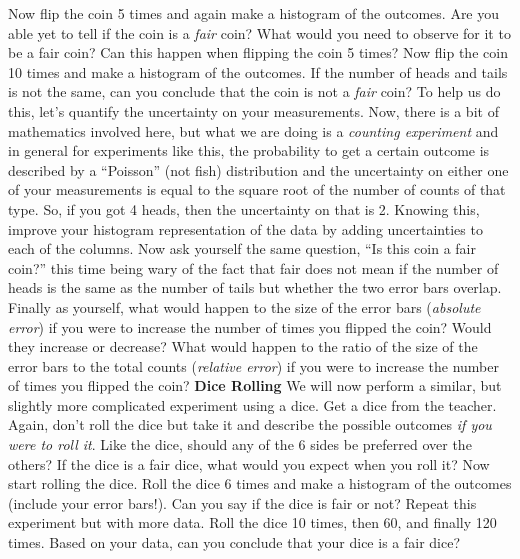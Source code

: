 \documentclass[12pt]{article}
\begin{document}
\newline
\newline
Now flip the coin 5 times and again make a histogram of the outcomes.  Are you able yet to tell if the coin is a \textit{fair} coin?  What would you need to observe for it to be a fair coin?  Can this happen when flipping the coin 5 times?
\newline
\newline
Now flip the coin 10 times and make a histogram of the outcomes.  If the number of heads and tails is not the same, can you conclude that the coin is not a \textit{fair} coin?  To help us do this, let's quantify the uncertainty on your measurements.  Now, there is a bit of mathematics involved here, but what we are doing is a \textit{counting experiment} and in general for experiments like this, the probability to get a certain outcome is described by a ``Poisson'' (not fish) distribution and the uncertainty on either one of your measurements is equal to the square root of the number of counts of that type.  So, if you got 4 heads, then the uncertainty on that is 2.  Knowing this, improve your histogram representation of the data by adding uncertainties to each of the columns.  Now ask yourself the same question, ``Is this coin a fair coin?'' this time being wary of the fact that fair does not mean if the number of heads is the same as the number of tails but whether the two error bars overlap.
\newline
\newline
Finally as yourself, what would happen to the size of the error bars (\textit{absolute error}) if you were to increase the number of times you flipped the coin?  Would they increase or decrease?  What would happen to the ratio of the size of the error bars to the total counts (\textit{relative error}) if you were to increase the number of times you flipped the coin?
\newline
\newline
\textbf{Dice Rolling}
\newline
We will now perform a similar, but slightly more complicated experiment using a dice.  Get a dice from the teacher.  Again, don't roll the dice but take it and describe the possible outcomes \textit{if you were to roll it}.  Like the dice, should any of the 6 sides be preferred over the others?  If the dice is a fair dice, what would you expect when you roll it?
\newline
\newline
Now start rolling the dice.  Roll the dice 6 times and make a histogram of the outcomes (include your error bars!).  Can you say if the dice is fair or not?  Repeat this experiment but with more data.  Roll the dice 10 times, then 60, and finally  120 times.  Based on your data, can you conclude that your dice is a fair dice?
\end{document}
